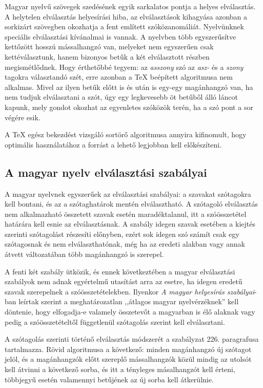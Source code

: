 \documentclass[12pt]{article}
\begin{document}
Magyar nyelvű szövegek szedésének egyik sarkalatos pontja a helyes
elválasztás. A helytelen elválasztás helyesírási hiba, az elválasztások
kihagyása azonban a sorkizárt szövegben okozhatja a fent említett
szóközanomáliát. Nyelvünknek speciális elválasztási kívánalmai is
vannak. A nyelvben több egyszerűsítve kettőzött hosszú mássalhangzó
van, melyeket nem egyszerűen csak kettéválasztunk, hanem bizonyos
betűk a két elválasztott részben megismétlődnek. Hogy érthetőbbé tegyem:
az \emph{asszony} szó az \emph{asz-} és a \emph{szony} tagokra választandó
szét, erre azonban a \TeX{} beépített algoritmusa nem alkalmas. Mivel
az ilyen betűk előtt is és után is egy-egy magánhangzó van, ha nem
tudjuk elválasztani a szót, úgy egy legkevesebb öt betűből álló láncot
kapunk, mely gondot okozhat az egyenletes szóközök terén, ha a szó
pont a sor végére esik.

A \TeX{} egész bekezdést vizsgáló sortörő algoritmusa annyira kifinomult,
hogy optimális használatához a forrást a lehető legjobban kell előkészíteni.


\subsection{A magyar nyelv elválasztási szabályai}

A magyar nyelvnek egyszerűek az elválasztási szabályai: a szavakat
szótagokra kell bontani, és az a szótaghatárok mentén elválasztható.
A szótagoló elválasztás nem alkalmazható összetett szavak esetén maradéktalanul,
itt a szóösszetétel határára kell esnie az elválasztásnak. A szabály
idegen szavak esetében a kiejtés szerinti szótagolást részesíti előnyben,
ezért sok idegen szó számít csak egy szótagosnak és nem elválaszthatónak,
még ha az eredeti alakban vagy annak átvett változatában több magánhangzó
is szerepel.

A fenti két szabály ütközik, és ennek következtében a magyar elválasztási
szabályok nem adnak egyértelmű utasítást arra az esetre, ha idegen
eredetű szavak szerepelnek a szóösszetételekben. Ilyenkor \emph{A
magyar helyesírás szabályai}-ban leírtak szerint a meghatározatlan
,,átlagos magyar nyelvérzéknek'' kell döntenie, hogy elfogadja-e valamely
összetevőt a magyarban is élő alaknak vagy pedig a szóösszetételtől
függetlenül szótagolás szerint kell elválasztani.

A szótagolás szerinti történő elválasztás módszerét a szabályzat 226.
paragrafusa tartalmazza. Rövid algoritmusa a következő: minden magánhangzó
új szótagot jelöl, és a magánhangzók előtt szereplő mássalhangzók
közül mindig az utolsót kell átvinni a következő sorba, és itt a tényleges
másalhangzót kell érteni, többjegyű esetén valamennyi betűjének az
új sorba kell átkerülnie.
\end{document}

